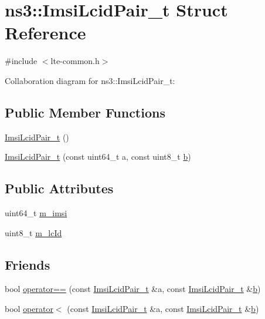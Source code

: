 \hypertarget{structns3_1_1ImsiLcidPair__t}{}\section{ns3\+:\+:Imsi\+Lcid\+Pair\+\_\+t Struct Reference}
\label{structns3_1_1ImsiLcidPair__t}


{\ttfamily \#include $<$lte-\/common.\+h$>$}



Collaboration diagram for ns3\+:\+:Imsi\+Lcid\+Pair\+\_\+t\+:
\subsection*{Public Member Functions}
\begin{DoxyCompactItemize}
\item 
\hyperlink{structns3_1_1ImsiLcidPair__t_a7bfc469ee2acc530b1697f0e652d1eb4}{Imsi\+Lcid\+Pair\+\_\+t} ()
\item 
\hyperlink{structns3_1_1ImsiLcidPair__t_a4d352b7a606a367d29e20b197646bd93}{Imsi\+Lcid\+Pair\+\_\+t} (const uint64\+\_\+t a, const uint8\+\_\+t \hyperlink{lte__pathloss_8m_a21ad0bd836b90d08f4cf640b4c298e7c}{b})
\end{DoxyCompactItemize}
\subsection*{Public Attributes}
\begin{DoxyCompactItemize}
\item 
uint64\+\_\+t \hyperlink{structns3_1_1ImsiLcidPair__t_ab8d6610383414991afa8b3acf0149f51}{m\+\_\+imsi}
\item 
uint8\+\_\+t \hyperlink{structns3_1_1ImsiLcidPair__t_a3c5c9627f5aa57d05aabf8dd3ab170d0}{m\+\_\+lc\+Id}
\end{DoxyCompactItemize}
\subsection*{Friends}
\begin{DoxyCompactItemize}
\item 
bool \hyperlink{structns3_1_1ImsiLcidPair__t_a6cb24e8610619e4c10f1c24da56cc86a}{operator==} (const \hyperlink{structns3_1_1ImsiLcidPair__t}{Imsi\+Lcid\+Pair\+\_\+t} \&a, const \hyperlink{structns3_1_1ImsiLcidPair__t}{Imsi\+Lcid\+Pair\+\_\+t} \&\hyperlink{lte__pathloss_8m_a21ad0bd836b90d08f4cf640b4c298e7c}{b})
\item 
bool \hyperlink{structns3_1_1ImsiLcidPair__t_a1c1937e9b8dbbc465ead253dd76a80cf}{operator$<$} (const \hyperlink{structns3_1_1ImsiLcidPair__t}{Imsi\+Lcid\+Pair\+\_\+t} \&a, const \hyperlink{structns3_1_1ImsiLcidPair__t}{Imsi\+Lcid\+Pair\+\_\+t} \&\hyperlink{lte__pathloss_8m_a21ad0bd836b90d08f4cf640b4c298e7c}{b})
\end{DoxyCompactItemize}


